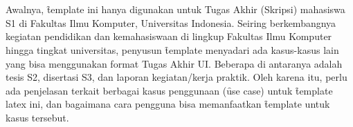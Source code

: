 \chapter{\babLima}
\label{bab:5}
Awalnya, \f{template} ini hanya digunakan untuk Tugas Akhir (Skripsi) mahasiswa S1 di Fakultas Ilmu Komputer, Universitas Indonesia. Seiring berkembangnya kegiatan pendidikan dan kemahasiswaan di lingkup Fakultas Ilmu Komputer hingga tingkat universitas, penyusun \f{template} menyadari ada kasus-kasus lain yang bisa menggunakan format Tugas Akhir UI. Beberapa di antaranya adalah tesis S2, disertasi S3, dan laporan kegiatan/kerja praktik. Oleh karena itu, perlu ada penjelasan terkait berbagai kasus penggunaan (\f{use case}) untuk \f{template} \gls{latex} ini, dan bagaimana cara pengguna bisa memanfaatkan \f{template} untuk kasus tersebut.


